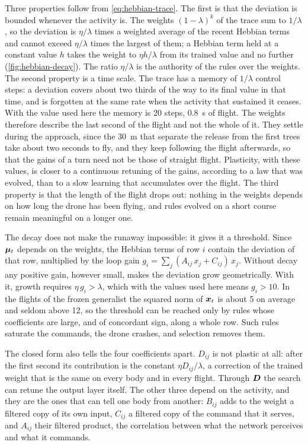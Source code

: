 Three properties follow from \eqref{eq:hebbian-trace}. The first is that the deviation is bounded whenever the activity is. The weights $(1-\lambda)^{k}$ of the trace sum to $1/\lambda$, so the deviation is $\eta/\lambda$ times a weighted average of the recent Hebbian terms and cannot exceed $\eta/\lambda$ times the largest of them; a Hebbian term held at a constant value $h$ takes the weight to $\eta h/\lambda$ from its trained value and no further (\autoref{fig:hebbian-decay}). The ratio $\eta/\lambda$ is the authority of the rules over the weights. The second property is a time scale. The trace has a memory of $1/\lambda$ control steps: a deviation covers about two thirds of the way to its final value in that time, and is forgotten at the same rate when the activity that sustained it ceases. With the value used here the memory is 20 steps, 0.8~s of flight. The weights therefore describe the last second of the flight and not the whole of it. They settle during the approach, since the 30~m that separate the release from the first trees take about two seconds to fly, and they keep following the flight afterwards, so that the gains of a turn need not be those of straight flight. Plasticity, with these values, is closer to a continuous retuning of the gains, according to a law that was evolved, than to a slow learning that accumulates over the flight. The third property is that the length of the flight drops out: nothing in the weights depends on how long the drone has been flying, and rules evolved on a short course remain meaningful on a longer one.

The decay does not make the runaway impossible: it gives it a threshold. Since $\bm{\mu}_t$ depends on the weights, the Hebbian terms of row $i$ contain the deviation of that row, multiplied by the loop gain $g_i = \sum_j (A_{ij}\, x_j + C_{ij})\, x_j$. Without decay any positive gain, however small, makes the deviation grow geometrically. With it, growth requires $\eta\, g_i > \lambda$, which with the values used here means $g_i > 10$. In the flights of the frozen generalist the squared norm of $\bm{x}_t$ is about 5 on average and seldom above 12, so the threshold can be reached only by rules whose coefficients are large, and of concordant sign, along a whole row. Such rules saturate the commands, the drone crashes, and selection removes them.

The closed form also tells the four coefficients apart. $D_{ij}$ is not plastic at all: after the first second its contribution is the constant $\eta D_{ij} / \lambda$, a correction of the trained weight that is the same on every body and in every flight. Through $\bm{D}$ the search can retune the output layer itself. The other three depend on the activity, and they are the ones that can tell one body from another: $B_{ij}$ adds to the weight a filtered copy of its own input, $C_{ij}$ a filtered copy of the command that it serves, and $A_{ij}$ their filtered product, the correlation between what the network perceives and what it commands.

